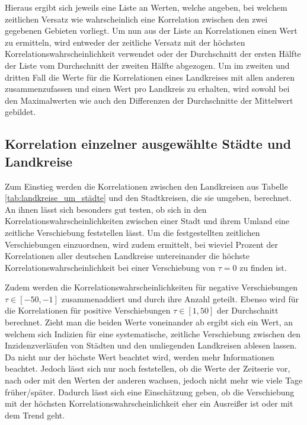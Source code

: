 Hieraus ergibt sich jeweils eine Liste an Werten, welche angeben, bei welchem zeitlichen Versatz wie wahrscheinlich eine Korrelation zwischen den zwei gegebenen Gebieten vorliegt.
Um nun aus der Liste an Korrelationen einen Wert zu ermitteln, wird entweder der zeitliche Versatz mit der höchsten Korrelationswahrscheinlichkeit verwendet oder der Durchschnitt der ersten Hälfte der Liste vom Durchschnitt der zweiten Hälfte abgezogen.
Um im zweiten und dritten Fall die Werte für die Korrelationen eines Landkreises mit allen anderen zusammenzufassen und einen Wert pro Landkreis zu erhalten, wird sowohl bei den Maximalwerten wie auch den Differenzen der Durchschnitte der Mittelwert gebildet.

\subsection{Korrelation einzelner ausgewählte Städte und Landkreise}
Zum Einstieg werden die Korrelationen zwischen den Landkreisen aus Tabelle \ref{tab:landkreise_um_städte} und den Stadtkreisen, die sie umgeben, berechnet. An ihnen lässt sich besonders gut testen, ob sich in den Korrelationswahrscheinlichkeiten zwischen einer Stadt und ihrem Umland eine zeitliche Verschiebung feststellen lässt.
Um die festgestellten zeitlichen Verschiebungen einzuordnen, wird zudem ermittelt, bei wieviel Prozent der Korrelationen aller deutschen Landkreise untereinander die höchste Korrelationswahrscheinlichkeit bei einer Verschiebung von $\tau = 0$ zu finden ist.

Zudem werden die Korrelationswahrscheinlichkeiten für negative Verschiebungen $ \tau\in[ -50,-1] $ zusammenaddiert und durch ihre Anzahl geteilt. Ebenso wird für die Korrelationen für positive Verschiebungen $\tau\in[ 1, 50]$ der Durchschnitt berechnet. Zieht man die beiden Werte voneinander ab ergibt sich ein Wert, an welchem sich Indizien für eine systematische, zeitliche Verschiebung zwischen den Inzidenzverläufen von Städten und den umliegenden Landkreisen ablesen lassen. Da nicht nur der höchste Wert beachtet wird, werden mehr Informationen beachtet. Jedoch lässt sich nur noch feststellen, ob die Werte der Zeitserie vor, nach oder mit den Werten der anderen wachsen, jedoch nicht mehr wie viele Tage früher/später. Dadurch lässt sich eine Einschätzung geben, ob die Verschiebung mit der höchsten Korrelationswahrscheinlichkeit eher ein Ausreißer ist oder mit dem Trend geht.

